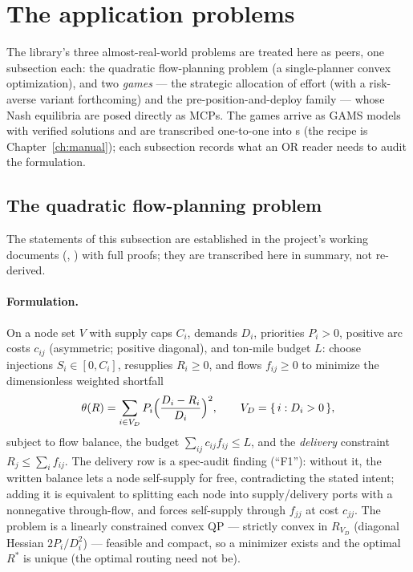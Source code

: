 \section{The application problems}
\label{sec:a-apps}

The library's three almost-real-world problems are treated here as peers,
one subsection each: the quadratic flow-planning problem (a single-planner
convex optimization), and two \emph{games} --- the strategic allocation of
effort (with a risk-averse variant forthcoming) and the
pre-position-and-deploy family --- whose Nash equilibria are posed directly
as MCPs. The games arrive as GAMS models with verified
solutions and are transcribed one-to-one into s (the recipe
is Chapter~\ref{ch:manual}); each subsection records what an OR reader
needs to audit the formulation.

\subsection{The quadratic flow-planning problem}
\label{sec:a-flowqp}

The statements of this subsection are established in the project's working
documents (, ) with
full proofs; they are transcribed here in summary, not re-derived.

\paragraph{Formulation.} On a node set $V$ with supply caps $C_i$, demands
$D_i$, priorities $P_i > 0$, positive arc costs $c_{ij}$ (asymmetric;
positive diagonal), and ton-mile budget $L$: choose injections
$S_i \in [0, C_i]$, resupplies $R_i \ge 0$, and flows $f_{ij} \ge 0$ to
minimize the dimensionless weighted shortfall
\[
\theta(R) = \sum_{i \in V_D} P_i \Bigl(\frac{D_i - R_i}{D_i}\Bigr)^{2},
\qquad V_D = \{\,i : D_i > 0\,\},
\]
subject to flow balance, the budget
$\sum_{ij} c_{ij} f_{ij} \le L$, and the \emph{delivery} constraint
$R_j \le \sum_i f_{ij}$. The delivery row is a spec-audit finding
(``F1''): without it, the written balance lets a node self-supply for free,
contradicting the stated intent; adding it is equivalent to splitting each
node into supply/delivery ports with a nonnegative through-flow, and forces
self-supply through $f_{jj}$ at cost $c_{jj}$. The problem is a linearly
constrained convex QP --- strictly convex in $R_{V_D}$ (diagonal Hessian
$2P_i/D_i^2$) --- feasible and compact, so a minimizer exists and the
optimal $R^\ast$ is unique (the optimal routing need not be).

